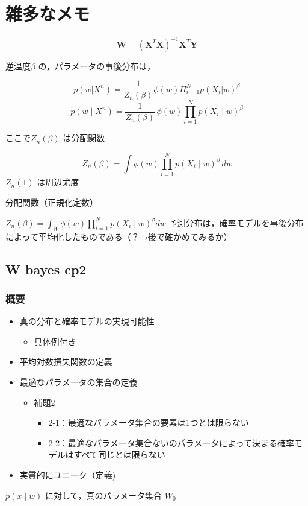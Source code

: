 \section{雑多なメモ}

\[
\boxed{\;\mathbf{W} = (\mathbf{X}^{T}\mathbf{X})^{-1}\mathbf{X}^{T}\mathbf{Y}\;}
\]

逆温度\({\beta}\) の，パラメータの事後分布は，

$$p(w|X^n) = \frac{1}{Z_n(\beta)}\phi(w)\Pi_{i=1}^{N}p(X_i|w)^{\beta} $$
$$p(w \mid X^n) = \frac{1}{Z_n(\beta)}\, \phi(w) \prod_{i=1}^{N} p(X_i \mid w)^{\beta}$$

ここで\({Z_n(\beta)}\) は分配関数

$$Z_n(\beta) = \int \phi(w) \prod_{i=1}^{N} p(X_i \mid w)^{\beta} \, dw$$
\({Z_n(1)}\) は周辺尤度


分配関数（正規化定数）

\({Z_n(\beta) = \int_{W} \phi(w) \prod_{i=1}^{N} p(X_i \mid w)^{\beta} dw}\)
予測分布は，確率モデルを事後分布によって平均化したものである（？→後で確かめてみるか）

\subsection{W bayes cp2}

\subsubsection{概要}

\begin{itemize}
\item 真の分布と確率モデルの実現可能性
\begin{itemize}
\item 具体例付き
\end{itemize}
\item 平均対数損失関数の定義
\item 最適なパラメータの集合の定義
\begin{itemize}
\item 補題2
\begin{itemize}
\item 2-1：最適なパラメータ集合の要素は1つとは限らない

\item 2-2：最適なパラメータ集合ないのパラメータによって決まる確率モデルはすべて同じとは限らない
\end{itemize}
\end{itemize}

\item 実質的にユニーク（定義)
\end{itemize}

\({p(x \mid w)}\) に対して，真のパラメータ集合 \({W_{0}}\)
